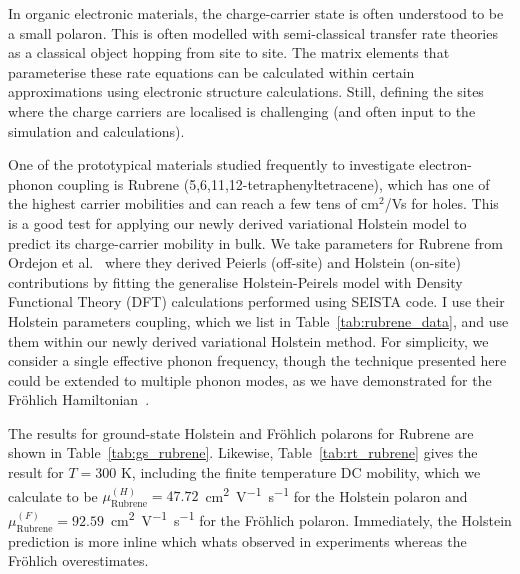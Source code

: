 In organic electronic materials, the charge-carrier state is often understood to be a small polaron. This is often modelled with semi-classical transfer rate theories as a classical object hopping from site to site. The matrix elements that parameterise these rate equations can be calculated within certain approximations using electronic structure calculations. Still, defining the sites where the charge carriers are localised is challenging (and often input to the simulation and calculations). 

One of the prototypical materials studied frequently to investigate electron-phonon coupling is Rubrene (5,6,11,12-tetraphenyltetracene), which has one of the highest carrier mobilities and can reach a few tens of cm$^2$/Vs for holes. This is a good test for applying our newly derived variational Holstein model to predict its charge-carrier mobility in bulk. We take parameters for Rubrene from Ordejon et al.~\cite{ordejon_ab_2017} where they derived Peierls (off-site) and Holstein (on-site) contributions by fitting the generalise Holstein-Peirels model with Density Functional Theory (DFT) calculations performed using SEISTA code. I use their Holstein parameters coupling, which we list in Table~\ref{tab:rubrene_data}, and use them within our newly derived variational Holstein method. For simplicity, we consider a single effective phonon frequency, though the technique presented here could be extended to multiple phonon modes, as we have demonstrated for the Fr\"ohlich Hamiltonian~\cite{martin_multiple_2023}.

The results for ground-state Holstein and Fr\"ohlich polarons for Rubrene are shown in Table~\ref{tab:gs_rubrene}. Likewise, Table~\ref{tab:rt_rubrene} gives the result for $T = 300$ K, including the finite temperature DC mobility, which we calculate to be $\mu^{(H)}_{\text{Rubrene}} = 47.72$~\si{cm^2V^{-1}s^{-1}} for the Holstein polaron and $\mu^{(F)}_{\text{Rubrene}} = 92.59$~\si{cm^2V^{-1}s^{-1}} for the Fr\"ohlich polaron. Immediately, the Holstein prediction is more inline which whats observed in experiments whereas the Fr\"ohlich overestimates.

